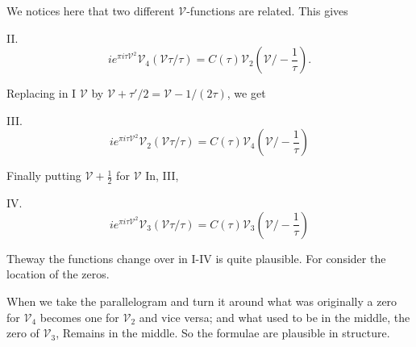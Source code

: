 We notices here that two different $\mathscr{V}$-functions are
related. This gives 

II. 
$$
i e^{\pi i \tau \mathscr{V}^2} \mathscr{V}_4 (\mathscr{V} \tau/ \tau)
= C(\tau) \mathscr{V}_2 \left(\mathscr{V}/ - \frac{1}{\tau}\right). 
$$

Replacing in I $\mathscr{V}$ by $\mathscr{V}+ \tau'/2= \mathscr{V}-
1/(2\tau)$, we get 

III. 
$$
i e^{\pi i \tau \mathscr{V}^2} \mathscr{V}_2 (\mathscr{V} \tau/\tau)=
C(\tau) \mathscr{V}_4 \left(\mathscr{V}/-\frac{1}{\tau}\right)
$$

Finally putting $\mathscr{V}+ \frac{1}{2}$ for $\mathscr{V}$ In, III,

IV. 
$$
ie^{\pi i \tau \mathscr{V}^2} \mathscr{V}_3 (\mathscr{V} \tau / \tau)
= C(\tau)\mathscr{V}_3 \left(\mathscr{V}/ - \frac{1}{\tau} \right)
$$

The\pageoriginale way the functions change over in I-IV is quite plausible. For
consider the location of the zeros. 

\medskip
\noindent
\begin{minipage}{3cm}
When we take the parallelogram and
turn it around what was originally a zero for  $\mathscr{V}_4$ becomes
one for $\mathscr{V}_2$ and vice versa; and what used to be in the
middle, the zero of $\mathscr{V}_3$, Remains in the middle. So the
formulae are plausible in structure. 
\end{minipage}
\begin{minipage}{7cm}
\begin{figure}[H]
\end{figure}
\end{minipage}

